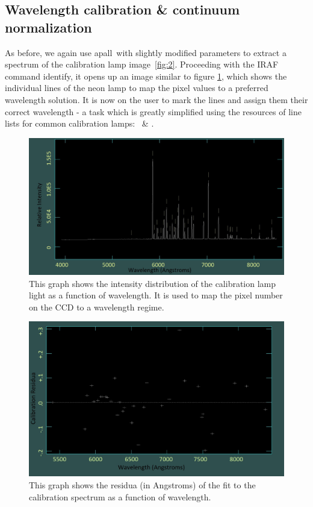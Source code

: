 \documentclass{article}
\begin{document}
\subsection{Wavelength calibration \& continuum normalization}
\label{ss:3}
As before, we again use \ldq apall\rdq ~with slightly modified parameters to extract a spectrum of the calibration lamp image~\ref{fig:2}. Proceeding with the IRAF command \ldq identify\rdq, it opens up an image similar to figure \ref{fig:7}, which shows the individual lines of the neon lamp to map the pixel values to a preferred wavelength solution. It is now on the user to mark the lines and assign them their correct wavelength - a task which is greatly simplified using the resources of line lists for common calibration lamps:~\parencite{Line_Identity_1} \& \parencite{Line_Identity_2}.
\begin{figure}[H]
  	\centering
    \includegraphics[width=1.00\textwidth]{spectroscopy/calibration_done.jpg}
 	\caption{This graph shows the intensity distribution of the calibration lamp light as a function of wavelength. It is used to map the pixel number on the CCD to a wavelength regime.}
 	\label{fig:7}
\end{figure}
\begin{figure}[H]
	\centering
	\includegraphics[width=1.00\textwidth]{spectroscopy/residua_calib.jpg}
  	\caption{This graph shows the residua (in Angstroms) of the fit to the calibration spectrum as a function of wavelength.}
  	\label{fig:8}
\end{figure}
\end{document}
